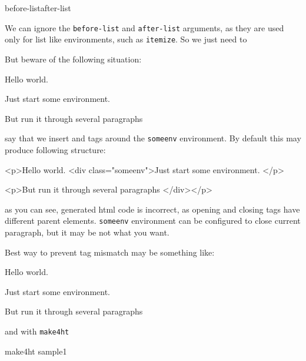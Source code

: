 \begin{texsource}
{before-list}{after-list}
\end{texsource}

We can ignore the \texttt{before-list} and \texttt{after-list} arguments, as they
are used only for list like environments, such as \texttt{itemize}. So we just need to






But beware of the following situation:

\begin{texsource}
Hello world.
\begin{someenv}
Just start some environment.

But run it through several paragraphs
\end{someenv}
\end{texsource}

say that we insert
 and
 tags around  the \texttt{someenv}
environment. By default this may produce following structure:

\begin{htmlsource}
<p>Hello world.
<div class="someenv">Just start some environment.
</p>

<p>But run it through several paragraphs
</div></p>
\end{htmlsource}

as you can see, generated html code is incorrect, as opening and closing
 tags have different parent elements. \texttt{someenv} environment can
be configured to close current paragraph, but it may be not what you
want.

Best way to prevent tag mismatch may be something like:

\begin{texsource}
Hello world.
\begin{someenv}
Just start some environment.
\end{someenv}

\begin{someenv}
But run it through several paragraphs
\end{someenv}
\end{texsource}

and with \texttt{make4ht}

\begin{shellcommand}
make4ht sample1
\end{shellcommand}

